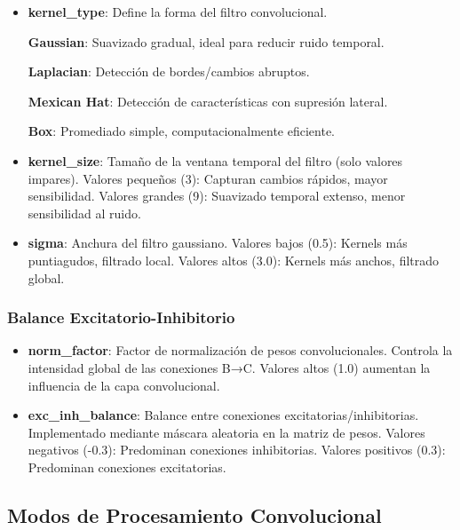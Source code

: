 \begin{itemize}
    \item \textbf{kernel\_type}: Define la forma del filtro convolucional.
    
    \textbf{Gaussian}: Suavizado gradual, ideal para reducir ruido temporal.
   
    \textbf{Laplacian}: Detección de bordes/cambios abruptos.

    \textbf{Mexican Hat}: Detección de características con supresión lateral.

    \textbf{Box}: Promediado simple, computacionalmente eficiente.
    
    \item \textbf{kernel\_size}: Tamaño de la ventana temporal del filtro (solo valores impares). 
    Valores pequeños (3): Capturan cambios rápidos, mayor sensibilidad.
Valores grandes (9): Suavizado temporal extenso, menor sensibilidad al ruido.
    \item \textbf{sigma}: Anchura del filtro gaussiano.
    Valores bajos (0.5): Kernels más puntiagudos, filtrado local.
Valores altos (3.0): Kernels más anchos, filtrado global.
\end{itemize}

\subsubsection{Balance Excitatorio-Inhibitorio}

\begin{itemize}
    \item \textbf{norm\_factor}: Factor de normalización de pesos convolucionales. Controla la intensidad global de las conexiones B→C. Valores altos (1.0) aumentan la influencia de la capa convolucional.
    \item \textbf{exc\_inh\_balance}: Balance entre conexiones excitatorias/inhibitorias. Implementado mediante máscara aleatoria en la matriz de pesos. Valores negativos (-0.3): Predominan conexiones inhibitorias. Valores positivos (0.3): Predominan conexiones excitatorias.
\end{itemize}

\subsection{Modos de Procesamiento Convolucional}
\label{subsec:modos-procesamiento}



